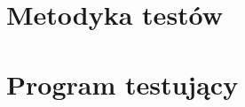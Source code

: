 \documentclass[12pt,a4paper,oneside]{report}
\begin{document}


\appendix

\chapter{Metodyka testów}



\chapter{Program testujący}






\clearpage
{}
{}
\printindex
\end{document}
